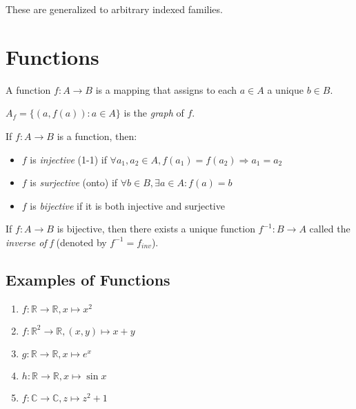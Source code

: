 \documentclass[12pt,a4paper]{article}
\begin{document}
These are generalized to arbitrary indexed families.

\section{Functions}

A function $f: A \rightarrow B$ is a mapping that assigns to each $a \in A$ a unique $b \in B$.

$A_f = \{(a,f(a)) : a \in A\}$ is the \textit{graph} of $f$.

If $f: A \rightarrow B$ is a function, then:

\begin{itemize}
    \item $f$ is \textit{injective} (1-1) if $\forall a_1, a_2 \in A, f(a_1) = f(a_2) \Rightarrow a_1 = a_2$
    \item $f$ is \textit{surjective} (onto) if $\forall b \in B, \exists a \in A : f(a) = b$
    \item $f$ is \textit{bijective} if it is both injective and surjective
\end{itemize}

If $f: A \rightarrow B$ is bijective, then there exists a unique function $f^{-1}: B \rightarrow A$ called the \textit{inverse of f} (denoted by $f^{-1} = f_{inv}$).

\subsection{Examples of Functions}

\begin{enumerate}
    \item $f: \mathbb{R} \rightarrow \mathbb{R}, x \mapsto x^2$
    \item $f: \mathbb{R}^2 \rightarrow \mathbb{R}, (x,y) \mapsto x+y$
    \item $g: \mathbb{R} \rightarrow \mathbb{R}, x \mapsto e^x$
    \item $h: \mathbb{R} \rightarrow \mathbb{R}, x \mapsto \sin x$
    \item $f: \mathbb{C} \rightarrow \mathbb{C}, z \mapsto z^2 + 1$
\end{enumerate}
\end{document}
